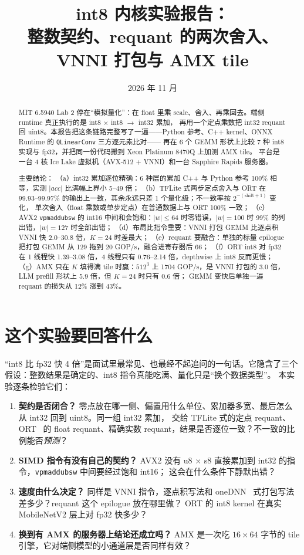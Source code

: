 \documentclass[11pt,a4paper]{ctexart}
\title{int8 内核实验报告：\\整数契约、requant 的两次舍入、VNNI 打包与 AMX tile}
\author{\authorline}
\date{2026 年 11 月}
\begin{document}
\maketitle

\begin{abstract}
MIT 6.5940 Lab 2 停在“模拟量化”：在 float 里乘 scale、舍入、再乘回去。端侧 runtime 真正执行的是 int8 $\times$ int8 $\to$ int32 累加，
再用一个定点乘数把 int32 requant 回 uint8。本报告把这条链路完整写了一遍——Python 参考、C++ kernel、ONNX Runtime 的 \texttt{QLinearConv} 三方逐元素比对——
再在 6 个 GEMM 形状上比较 7 种 int8 实现与 fp32，并把同一份代码搬到 Xeon Platinum 8470Q 上加测 AMX tile。
平台是一台 4 核 Ice Lake 虚拟机（AVX-512 + VNNI）和一台 Sapphire Rapids 服务器。

主要结论：
（a）int32 累加逐位精确：6 种层的累加 C++ 与 Python 参考 100\% 相等，实测 $|acc|$ 比满幅上界小 5--49 倍；
（b）TFLite 式两步定点舍入与 ORT 在 99.93--99.97\% 的输出上一致，其余永远只差 1 个量化级；不一致率按 $2^{-(\mathrm{shift}+1)}$ 变化，
    单次舍入（float 乘数或单步定点）在普通数据上与 ORT 100\% 一致；
（c）AVX2 \texttt{vpmaddubsw} 的 int16 中间和会饱和：$|w|\le 64$ 时零错误，$|w|=100$ 时 99\% 的列出错，$|w|=127$ 时全部出错；
（d）布局比指令重要：VNNI 打包 GEMM 比逐点积 VNNI 快 2.0--30.8 倍，$K=24$ 时差最大；
（e）requant 要融合：单独的标量 epilogue 把打包 GEMM 从 129 拖到 20 GOP/s，融合进寄存器后 66；
（f）ORT int8 对 fp32 在 1 线程快 1.39--3.08 倍，4 线程只有 0.76--2.14 倍，depthwise 上 int8 反而更慢；
（g）AMX 只在 $K$ 填得满 tile 时赢：$512^3$ 上 1704 GOP/s，是 VNNI 打包的 3.0 倍，LLM prefill 形状上 5.9 倍，但 $K=24$ 时只有 0.6 倍；
    GEMM 变快后单独一遍 requant 的损失从 12\% 涨到 43\%。
\end{abstract}

\tableofcontents
\newpage

\section{这个实验要回答什么}

“int8 比 fp32 快 4 倍”是面试里最常见、也最经不起追问的一句话。它隐含了三个假设：整数结果是确定的、int8 指令真能吃满、量化只是“换个数据类型”。
本实验逐条检验它们：

\begin{enumerate}
  \item \textbf{契约是否闭合？} 零点放在哪一侧、偏置用什么单位、累加器多宽、最后怎么从 int32 回到 uint8。同一组 int32 累加，
        交给 TFLite 式的定点 requant、ORT~\cite{ort} 的 float requant、精确实数 requant，结果是否逐位一致？不一致的比例能否\emph{预测}？
  \item \textbf{SIMD 指令有没有自己的契约？} AVX2 没有 u8 $\times$ s8 直接累加到 int32 的指令，\texttt{vpmaddubsw} 中间要经过饱和 int16；
        这会在什么条件下静默出错？
  \item \textbf{速度由什么决定？} 同样是 VNNI 指令，逐点积写法和 oneDNN~\cite{onednn} 式打包写法差多少？requant 这个 epilogue 放在哪里做？
        ORT 的 int8 kernel 在真实 MobileNetV2 层上对 fp32 快多少？
  \item \textbf{换到有 AMX 的服务器上结论还成立吗？} AMX 是一次吃 $16\times 64$ 字节的 tile 引擎，它对端侧模型的小通道层是否同样有效？
\end{enumerate}
\end{document}
